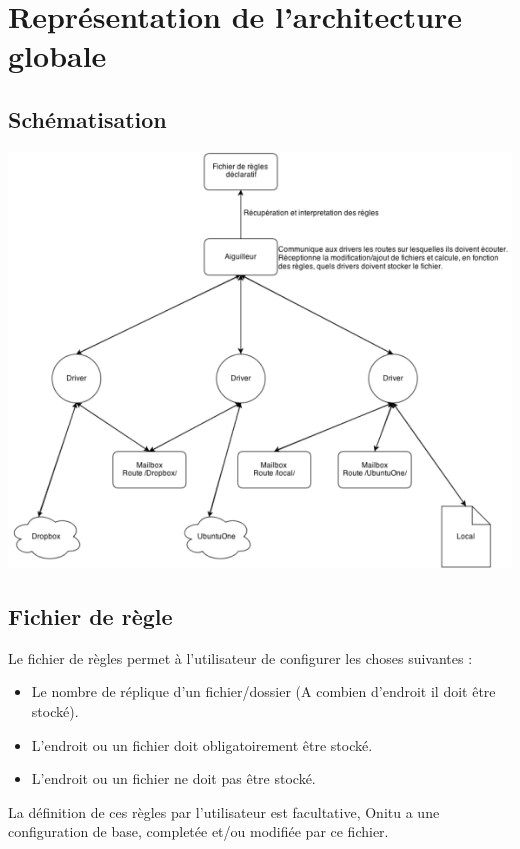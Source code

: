 \chapter{Représentation de l’architecture globale}
\thispagestyle{EIP}

\section{Schématisation}
\includegraphics{schema_architecture_globale.png} 

\newpage
\section{Fichier de règle}

Le fichier de règles permet à l'utilisateur de configurer les choses suivantes :
\newline

\begin{itemize}
\itemsep1pt\parskip0pt
\item
  Le nombre de réplique d'un fichier/dossier (A combien d'endroit il doit être stocké).
\item
  L'endroit ou un fichier doit obligatoirement être stocké.
\item
  L'endroit ou un fichier ne doit pas être stocké.
\newline
\end{itemize}

La définition de ces règles par l'utilisateur est facultative, Onitu a une configuration de base, completée et/ou modifiée par ce fichier.


